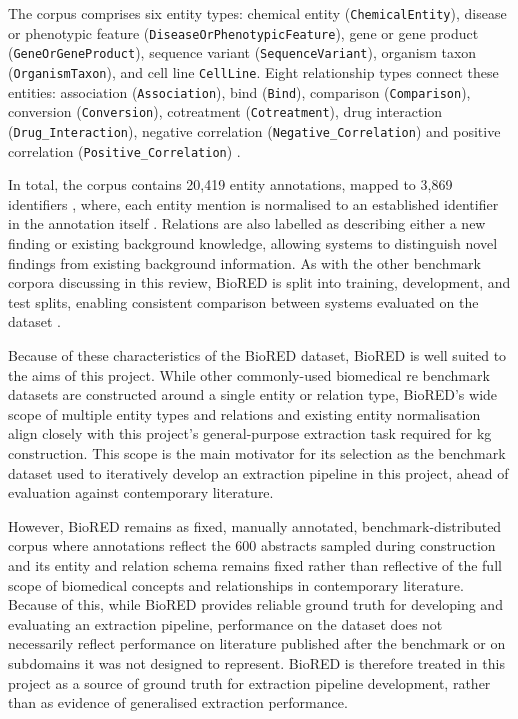 The corpus comprises six entity types: chemical entity (\verb|ChemicalEntity|), disease or phenotypic feature (\verb|DiseaseOrPhenotypicFeature|), gene or gene product (\verb|GeneOrGeneProduct|), sequence variant (\verb|SequenceVariant|), organism taxon (\verb|OrganismTaxon|), and cell line \verb|CellLine|. Eight relationship types connect these entities: association (\verb|Association|), bind (\verb|Bind|), comparison (\verb|Comparison|), conversion (\verb|Conversion|), cotreatment (\verb|Cotreatment|), drug interaction (\texttt{Drug\_Interaction}), negative correlation (\verb|Negative_Correlation|) and positive correlation (\verb|Positive_Correlation|) \cite{luo2022_biored}.

In total, the corpus contains 20,419 entity annotations, mapped to 3,869 identifiers \ck, where, each entity mention is normalised to an established identifier in the annotation itself \cite{luo2022_biored}. Relations are also labelled as describing either a new finding or existing background knowledge, allowing systems to distinguish novel findings from existing background information. As with the other benchmark corpora discussing in this review, BioRED is split into training, development, and test splits, enabling consistent comparison between systems evaluated on the dataset \cite{luo2022_biored}.

Because of these characteristics of the BioRED dataset, BioRED is well suited to the aims of this project. While other commonly-used biomedical \gls{re} benchmark datasets are constructed around a single entity or relation type, BioRED's wide scope of multiple entity types and relations and existing entity normalisation align closely with this project's general-purpose extraction task required for \gls{kg} construction. This scope is the main motivator for its selection as the benchmark dataset used to iteratively develop an extraction pipeline in this project, ahead of evaluation against contemporary literature.

However, BioRED remains as fixed, manually annotated, benchmark-distributed corpus where annotations reflect the 600 abstracts sampled during construction and its entity and relation schema remains fixed rather than reflective of the full scope of biomedical concepts and relationships in contemporary literature. Because of this, while BioRED provides reliable ground truth for developing and evaluating an extraction pipeline, performance on the dataset does not necessarily reflect performance on literature published after the benchmark or on subdomains it was not designed to represent. BioRED is therefore treated in this project as a source of ground truth for extraction pipeline development, rather than as evidence of generalised extraction performance.

